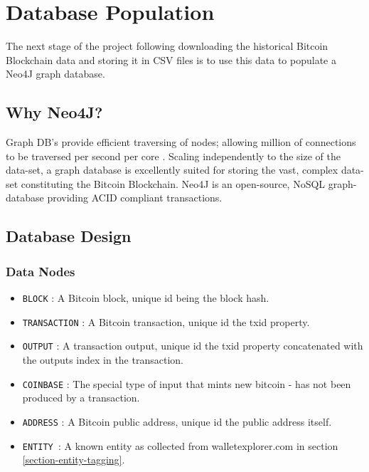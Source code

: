 \section{Database Population}
The next stage of the project following downloading the historical Bitcoin Blockchain data and storing it in CSV files is to use this data to populate a Neo4J graph database. 

\subsection{Why Neo4J?}
Graph DB's provide efficient traversing of nodes; allowing million of connections to be traversed per second per core \cite{RefWorks:doc:5c98f0c6e4b00cbb4da393d8}. Scaling independently to the size of the data-set, a graph database is excellently suited for storing the vast, complex data-set constituting the Bitcoin Blockchain. Neo4J is an open-source, NoSQL graph-database providing ACID compliant transactions.

\subsection{Database Design}

\subsubsection{Data Nodes}
\begin{itemize}
    \item \texttt{BLOCK} : A Bitcoin block, unique id being the block hash. 
    \item \texttt{TRANSACTION} : A Bitcoin transaction, unique id the txid property.
    \item \texttt{OUTPUT} : A transaction output, unique id the txid property concatenated with the outputs index in the transaction.
    \item \texttt{COINBASE} : The special type of input that mints new bitcoin - has not been produced by a transaction. 
    \item \texttt{ADDRESS} : A Bitcoin public address, unique id the public address itself.
    \item \texttt{ENTITY }: A known entity as collected from walletexplorer.com in section \ref{section-entity-tagging}. 
\end{itemize}

